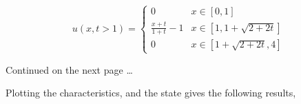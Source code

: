 \begin{adjustwidth}{2.5em}{0pt}
    \vspace{-0.35in}
    \begin{equation*}
        \boxed{u(x, t> 1) = \begin{cases}
            0 & x \in [0,1]\\
            \frac{x+t}{1+t} - 1 & x \in [1,1+\sqrt{2+2t}]\\ 
            0 & x \in [1+\sqrt{2+2t}, 4]
        \end{cases}}
    \end{equation*}

    \vfill 
    Continued on the next page \ldots 
    
\end{adjustwidth}

\pagebreak

\begin{adjustwidth}{2.5em}{0pt}
    Plotting the characteristics, and the state gives the following results,


\end{adjustwidth}
